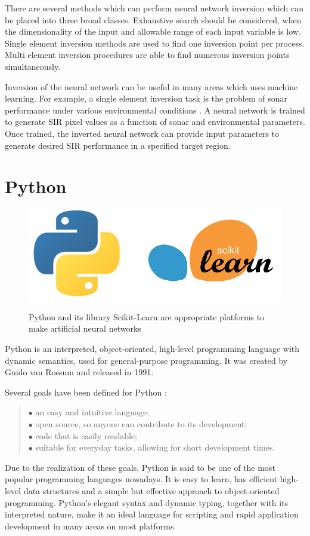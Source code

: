 There are several methods which can perform neural network inversion which can be placed into three broad classes. Exhaustive search should be considered, when the dimensionality of the input and allowable range of each input variable is low. Single element inversion methods are used to find one inversion point per process. Multi element inversion procedures are able to find numerous inversion points simultaneously. \medskip

Inversion of the neural network can be useful in many areas which uses machine learning. For example, a single element inversion task is the problem of sonar performance under various environmental conditions \cite{article}. A neural network is trained to generate SIR pixel values as a function of sonar and environmental parameters. Once trained, the inverted neural network can provide input parameters to generate desired SIR performance in a specified target region.



\section{Python}

\begin{figure}[h]
	\centering
	\caption{Python and its library Scikit-Learn are appropriate platforms to make artificial neural networks}
	\includegraphics[height=0.25\linewidth]{./figures/python_scikit}
	\label{fig:python_scikit}
\end{figure}

Python \cite{vanderplas2016python} is an interpreted, object-oriented, high-level programming language with dynamic semantics, used for general-purpose programming. It was created by Guido van Rossum and released in 1991. \medskip

\noindent Several goals have been defined for Python \cite{van2011introduction}:
\begin{verse}
	$\bullet$ an easy and intuitive language;\\
	$\bullet$ open source, so anyone can contribute to its development;\\
	$\bullet$ code that is easily readable;\\
	$\bullet$ suitable for everyday tasks, allowing for short development times.
\end{verse}
Due to the realization of these goals, Python is said to be one of the most popular programming languages nowadays. It is easy to learn, has efficient high-level data structures and a simple but effective approach to object-oriented programming. Python's elegant syntax and dynamic typing, together with its interpreted nature, make it an ideal language for scripting and rapid application development in many areas on most platforms.\medskip

